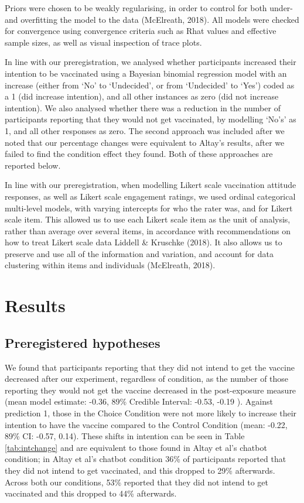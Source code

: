 \documentclass[
  english,
  ,jou,floatsintext]{apa6}
\begin{document}
Priors were chosen to be weakly regularising, in order to control for both under- and overfitting the model to the data (McElreath, 2018). All models were checked for convergence using convergence criteria such as Rhat values and effective sample sizes, as well as visual inspection of trace plots.

In line with our preregistration, we analysed whether participants increased their intention to be vaccinated using a Bayesian binomial regression model with an increase (either from `No' to `Undecided', or from `Undecided' to `Yes') coded as a 1 (did increase intention), and all other instances as zero (did not increase intention). We also analysed whether there was a reduction in the number of participants reporting that they would not get vaccinated, by modelling `No's' as 1, and all other responses as zero. The second approach was included after we noted that our percentage changes were equivalent to Altay's results, after we failed to find the condition effect they found. Both of these approaches are reported below.

In line with our preregistration, when modelling Likert scale vaccination attitude responses, as well as Likert scale engagement ratings, we used ordinal categorical multi-level models, with varying intercepts for who the rater was, and for Likert scale item. This allowed us to use each Likert scale item as the unit of analysis, rather than average over several items, in accordance with recommendations on how to treat Likert scale data Liddell \& Kruschke (2018). It also allows us to preserve and use all of the information and variation, and account for data clustering within items and individuals (McElreath, 2018).

\hypertarget{results}{%
\section{Results}\label{results}}

\hypertarget{preregistered-hypotheses-1}{%
\subsection{Preregistered hypotheses}\label{preregistered-hypotheses-1}}

We found that participants reporting that they did not intend to get the vaccine decreased after our experiment, regardless of condition, as the number of those reporting they would not get the vaccine decreased in the post-exposure measure (mean model estimate: -0.36, 89\% Credible Interval: -0.53, -0.19 ). Against prediction 1, those in the Choice Condition were not more likely to increase their intention to have the vaccine compared to the Control Condition (mean: -0.22, 89\% CI: -0.57, 0.14). These shifts in intention can be seen in Table \ref{tab:intchange} and are equivalent to those found in Altay et al's chatbot condition; in Altay et al's chatbot condition 36\% of participants reported that they did not intend to get vaccinated, and this dropped to 29\% afterwards. Across both our conditions, 53\% reported that they did not intend to get vaccinated and this dropped to 44\% afterwards.
\end{document}
